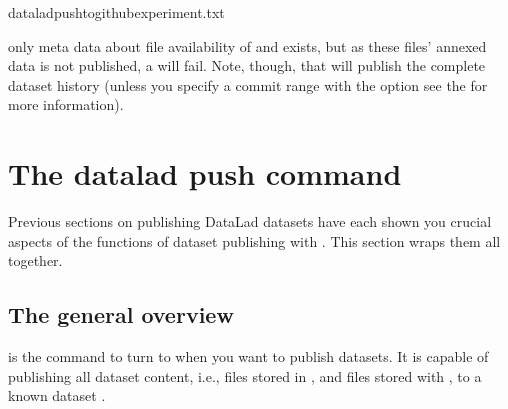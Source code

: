 \begin{sphinxVerbatim}[commandchars=\\\{\}]
dataladpush\PYGZhy{}\PYGZhy{}togithubexperiment.txt
\end{sphinxVerbatim}

\sphinxAtStartPar
only meta data about file availability of  and  exists, but as these files’ annexed data is not published, a 
will fail.
Note, though, that  will publish the complete dataset history (unless you specify a commit range with the  option \textendash{} see the  for more information).

\sphinxstepscope

\ignorespaces 

\section{The datalad push command}
\label{\detokenize{basics/101-141-push:the-datalad-push-command}}\label{\detokenize{basics/101-141-push:push}}\label{\detokenize{basics/101-141-push:index-0}}\label{\detokenize{basics/101-141-push::doc}}
\sphinxAtStartPar
Previous sections on publishing DataLad datasets  have each
shown you crucial aspects of the functions of dataset publishing with
. This section wraps them all together.


\subsection{The general overview}
\label{\detokenize{basics/101-141-push:the-general-overview}}
\sphinxAtStartPar
{} is the command to turn to when you want to publish datasets.
It is capable of publishing all dataset content, i.e., files stored in {\hyperref[\detokenize{glossary:term-Git}]{}},
and files stored with {\hyperref[\detokenize{glossary:term-git-annex}]{}}, to a known dataset {\hyperref[\detokenize{glossary:term-sibling}]{}}.

